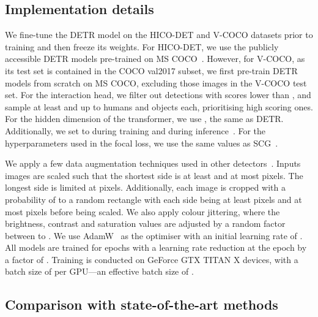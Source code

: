 \documentclass[10pt,twocolumn,letterpaper]{article}
\begin{document}
\subsection{Implementation details}

We fine-tune the DETR model on the HICO-DET and V-COCO datasets prior to training and then freeze its weights. For HICO-DET, we use the publicly accessible DETR models pre-trained on MS COCO~\cite{coco}. However, for V-COCO, as its test set is contained in the COCO val2017 subset, we first pre-train DETR models from scratch on MS COCO, excluding those images in the V-COCO test set. For the interaction head, we filter out detections with scores lower than , and sample at least  and up to  humans and objects each, prioritising high scoring ones. For the hidden dimension of the transformer, we use , the same as DETR. Additionally, we set  to  during training and  during inference~\cite{scg}. For the hyperparameters used in the focal loss, we use the same values as SCG~\cite{scg}.

We apply a few data augmentation techniques used in other detectors~\cite{detr,qpic}. Inputs images are scaled such that the shortest side is at least  and at most  pixels. The longest side is limited at  pixels. Additionally, each image is cropped with a probability of  to a random rectangle with each side being at least  pixels and at most  pixels before being scaled. We also apply colour jittering, where the brightness, contrast and saturation values are adjusted by a random factor between  to . We use AdamW~\cite{adamw} as the optimiser with an initial learning rate of . All models are trained for  epochs with a learning rate reduction at the  epoch by a factor of . Training is conducted on  GeForce GTX TITAN X devices, with a batch size of  per GPU---an effective batch size of .

\subsection{Comparison with state-of-the-art methods}
\end{document}
